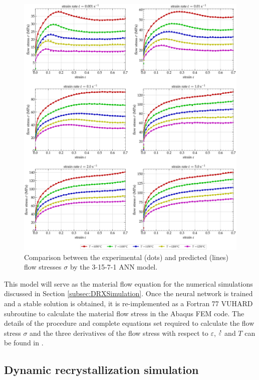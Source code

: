\documentclass[metals,article,submit,pdftex,moreauthors]{Definitions/mdpi}
\DeclareRobustCommand{\mdot}[1]{\accentset{\mbox{\bfseries .}}{#1}}
\begin{document}
\begin{figure}[H]
\centering
\includegraphics[width=0.9\columnwidth]{Figures/CompExpANN-3-15-7-1}
\caption{Comparison between the experimental (dots) and predicted (lines) flow stresses $\sigma$ by the 3-15-7-1 ANN model.}
\label{fig:ANN-3-15-7-1}
\end{figure}
This model will serve as the material flow equation for the numerical simulations discussed in Section \ref{subsec:DRXSimulation}.
Once the neural network is trained and a stable solution is obtained, it is re-implemented as a Fortran 77 VUHARD subroutine to calculate the material flow stress in the Abaqus FEM code. The details of the procedure and complete equations set required to calculate the flow stress $\sigma$ and the three derivatives of the flow stress with respect to $\varepsilon$, $\mdot{\varepsilon}$ and $T$ can be found in \cite{Pantale-2021}.

\subsection{Dynamic recrystallization simulation\label{subsec:DRXSimulation}}
\end{document}
